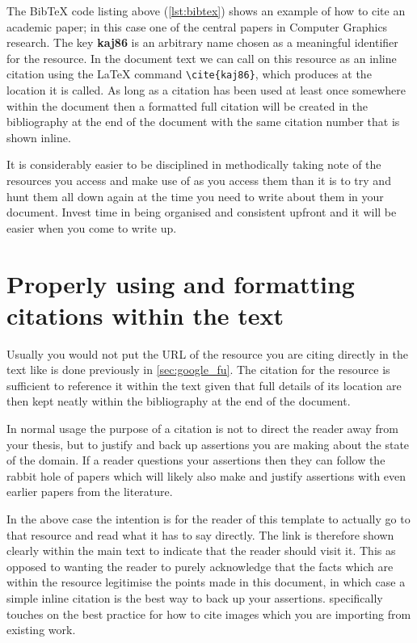 		
		
The Bib\TeX{} code listing above (\cref{lst:bibtex}) shows an example of how to cite an academic paper; in this case one of the central papers in Computer Graphics research.
The key \textbf{kaj86} is an arbitrary name chosen as a meaningful identifier for the resource.
In the document text we can call on this resource as an inline citation using the \LaTeX{} command \lstinline|\cite{kaj86}|, which produces \cite{kaj86} at the location it is called.
As long as a citation has been used at least once somewhere within the document then a formatted full citation will be created in the bibliography at the end of the document with the same citation number that is shown inline.
		
It is considerably easier to be disciplined in methodically taking note of the resources you access and make use of as you access them than it is to try and hunt them all down again at the time you need to write about them in your document.
Invest time in being organised and consistent upfront and it will be easier when you come to write up.


	\section{Properly using and formatting citations within the text}

Usually you would not put the URL of the resource you are citing directly in the text like is done previously in \cref{sec:google_fu}.
The citation for the resource \cite{gwern} is sufficient to reference it within the text given that full details of its location are then kept neatly within the bibliography at the end of the document.

In normal usage the purpose of a citation is not to direct the reader away from your thesis, but to justify and back up assertions you are making about the state of the domain.
If a reader questions your assertions then they can follow the rabbit hole of papers which will likely also make and justify assertions with even earlier papers from the literature. 

In the above case the intention is for the reader of this template to actually go to that resource and read what it has to say directly.
The link is therefore shown clearly within the main text to indicate that the reader should visit it.
This as opposed to wanting the reader to purely acknowledge that the facts which are within the resource legitimise the points made in this document, in which case a simple inline citation is the best way to back up your assertions.
 specifically touches on the best practice for how to cite images which you are importing from existing work. 
